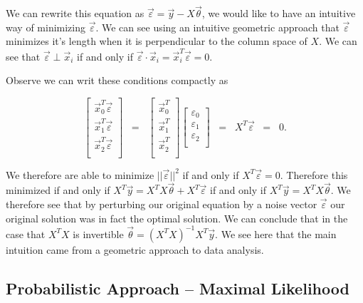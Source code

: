 \documentclass{article}
\begin{document}
\noindent We can rewrite this equation as $\vec{\varepsilon} = \vec{y} - X \vec{\theta}$, we would like to have an intuitive way of minimizing $\vec{\varepsilon}$.  We can see using an intuitive geometric approach that $\vec{\varepsilon}$ minimizes it's length when it is perpendicular to the column space of $X$.  We can see that $\vec{\varepsilon} \perp \vec{x}_i$ if and only if $\vec{\varepsilon} \cdot \vec{x}_i = \vec{x}_i^T \vec{\varepsilon} = 0$. 

\noindent Observe we can writ these conditions compactly as 

\begin{equation*}
\left [ \begin{array}{c}
\vec{x}_0^T\vec{\varepsilon} \\
\vec{x}_1^T \vec{\varepsilon} \\
\vec{x}_2^T \vec{\varepsilon}\\
\end{array} \right ] \;\; =\;\; \left [ \begin{array}{c}
\vec{x}_0^T \\
\vec{x}_1^T \\
\vec{x}_2^T \\
\end{array} \right ] \left [ \begin{array}{c}
\varepsilon_0 \\
\varepsilon_1 \\
\varepsilon_2 \\
\end{array} \right ] \;\; =\;\; X^T \vec{\varepsilon} \;\; =\;\; 0.
\end{equation*}

\noindent We therefore are able to minimize $||\vec{\varepsilon}||^2$ if and only if $X^T \vec{\varepsilon} = 0$.  Therefore this minimized if and only if $X^T\vec{y} = X^TX \vec{\theta} + X^T \vec{\varepsilon}$ if and only if $X^T \vec{y}= X^TX \vec{\theta}$.  We therefore see that by perturbing our original equation by a noise vector $\vec{\varepsilon}$ our original solution was in fact the optimal solution.  We can conclude that in the case that $X^TX$ is invertible $\vec{\theta} = (X^TX)^{-1} X^T\vec{y}$.  We see here that the main intuition came from a geometric approach to data analysis.

\subsection{Probabilistic Approach -- Maximal Likelihood}
\end{document}
